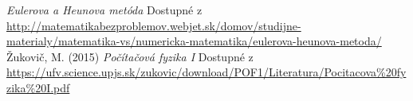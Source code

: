 \documentclass{article}
\theoremstyle{definition}
\theoremstyle{remark}
\begin{document}
\pagebreak






\begin{thebibliography}{99}
 \emph{Eulerova a Heunova metóda} Dostupné z \url{http://matematikabezproblemov.webjet.sk/domov/studijne-materialy/matematika-vs/numericka-matematika/eulerova-heunova-metoda/}
Žukovič, M. (2015) \emph{Počítačová fyzika I} Dostupné z \url{https://ufv.science.upjs.sk/zukovic/download/POF1/Literatura/Pocitacova%20fyzika%20I.pdf}
\end{thebibliography}
\end{document}
